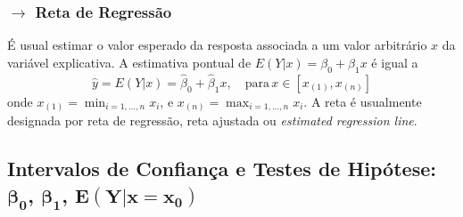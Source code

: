 \subsubsection[7.1.3 Reta de Regressão]{$\pmb{\rightarrow}$ Reta de Regressão}

\begin{mdframed}
    É usual estimar o valor esperado da resposta associada a um valor arbitrário $x$ da variável explicativa. A estimativa pontual de $E(Y|x) = \beta_0 + \beta_1 x$ é igual a
    $$
        \hat{y} = \widehat{E(Y|x)} = \hat{\beta}_0 + \hat{\beta}_1 x, \quad \text{para}\, x \in [x_{(1)}, x_{(n)}] 
    $$
    onde $x_{(1)} = \min_{i=1,\dots,n} x_i$, e $x_{(n)} = \max_{i=1,\dots,n} x_i$. A reta é usualmente designada por reta de regressão, reta ajustada ou \textit{estimated regression line}.
\end{mdframed}

\newpage
\subsection[7.2 Intervalos de Confiança e Testes de Hipótese para $\beta_0$, $\beta_1$ e $E(Y|x=x_0)$]{\hspace*{0.075 em}\raisebox{0.2 em}{$\pmb{\drsh}$} Intervalos de Confiança e Testes de Hipótese: $\pmb{\beta_0}$, $\pmb{\beta_1}$, $\mathbf{E(Y|x=x_0)}$}

